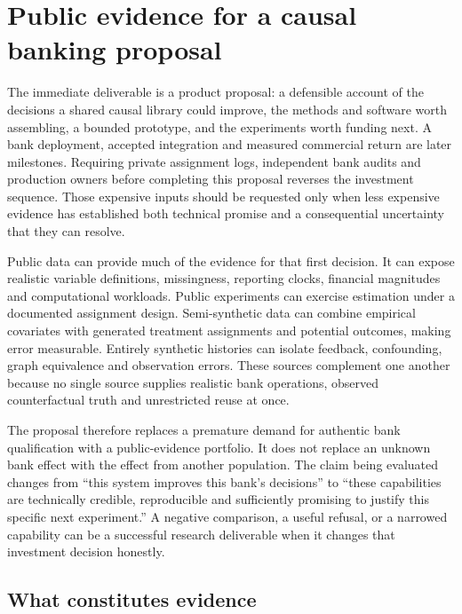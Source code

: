 \hypertarget{pd15:evidence}{%
\chapter{Public evidence for a causal banking
proposal}\label{pd15:evidence}}

The immediate deliverable is a product proposal: a defensible account of
the decisions a shared causal library could improve, the methods and
software worth assembling, a bounded prototype, and the experiments
worth funding next. A bank deployment, accepted integration and measured
commercial return are later milestones. Requiring private assignment
logs, independent bank audits and production owners before completing
this proposal reverses the investment sequence. Those expensive inputs
should be requested only when less expensive evidence has established
both technical promise and a consequential uncertainty that they can
resolve.

Public data can provide much of the evidence for that first decision. It
can expose realistic variable definitions, missingness, reporting
clocks, financial magnitudes and computational workloads. Public
experiments can exercise estimation under a documented assignment
design. Semi-synthetic data can combine empirical covariates with
generated treatment assignments and potential outcomes, making error
measurable. Entirely synthetic histories can isolate feedback,
confounding, graph equivalence and observation errors. These sources
complement one another because no single source supplies realistic bank
operations, observed counterfactual truth and unrestricted reuse at
once.

The proposal therefore replaces a premature demand for authentic bank
qualification with a public-evidence portfolio. It does not replace an
unknown bank effect with the effect from another population. The claim
being evaluated changes from ``this system improves this bank's
decisions'' to ``these capabilities are technically credible,
reproducible and sufficiently promising to justify this specific next
experiment.'' A negative comparison, a useful refusal, or a narrowed
capability can be a successful research deliverable when it changes that
investment decision honestly.

\hypertarget{what-constitutes-evidence}{%
\section{What constitutes evidence}\label{what-constitutes-evidence}}

